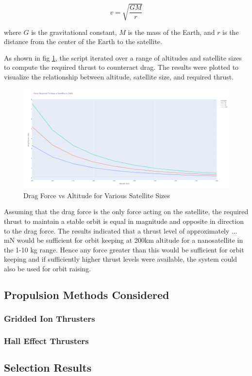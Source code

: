 \begin{equation}
    v = \sqrt{\frac{GM}{r}}
\end{equation}

where \( G \) is the gravitational constant, \( M \) is the mass of the Earth, and \( r \) is the distance from the center of the Earth to the satellite.


As shown in fig \ref{fig:drag_force_vs_altitude}, the script iterated over a range of altitudes and satellite sizes to compute the required thrust to counteract drag. The results were plotted to visualize the relationship between altitude, satellite size, and required thrust.

\begin{figure}[H]
    \centering
    \includegraphics[width=1.0\textwidth]{images/Misc/150km - 240km.png}
    \caption{Drag Force vs Altitude for Various Satellite Sizes}
    \label{fig:drag_force_vs_altitude}
\end{figure}

Assuming that the drag force is the only force acting on the satellite, the required thrust to maintain a stable orbit is equal in magnitude and opposite in direction to the drag force. The results indicated that a thrust level of approximately ... mN would be sufficient for orbit keeping at 200km altitude for a nanosatellite in the 1-10 kg range. Hence any force greater than this would be sufficient for orbit keeping and if sufficiently higher thrust levels were available, the system could also be used for orbit raising.

\subsection{Propulsion Methods Considered}

\subsubsection{Gridded Ion Thrusters}

\subsubsection{Hall Effect Thrusters}

\subsection{Selection Results}

